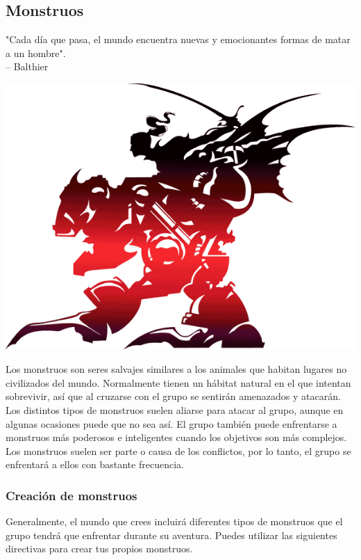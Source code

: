 \subsection*{\hypertarget{monster}{Monstruos}}
"Cada día que pasa, el mundo encuentra nuevas y emocionantes formas de matar a un hombre".\\
\indent -- Balthier
\vspace*{0.3cm}
\begin{center} \includegraphics[width=\columnwidth]{./art/images/ff6.png} \end{center}
\vspace*{0.3cm}
%
Los monstruos son seres salvajes similares a los animales que habitan lugares no civilizados del mundo. Normalmente tienen un hábitat natural en el que intentan sobrevivir, así que al cruzarse con el grupo se sentirán amenazados y atacarán. Los distintos tipos de monstruos suelen aliarse para atacar al grupo, aunque en algunas ocasiones puede que no sea así. El grupo también puede enfrentarse a monstruos más poderosos e inteligentes cuando los objetivos son más complejos. Los monstruos suelen ser parte o causa de los conflictos, por lo tanto, el grupo se enfrentará a ellos con bastante frecuencia. \subsubsection*{Creación de monstruos}
Generalmente, el mundo que crees incluirá diferentes tipos de monstruos que el grupo tendrá que enfrentar durante su aventura. Puedes utilizar las siguientes directivas para crear tus propios monstruos.

